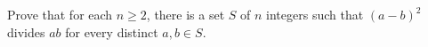 Prove that for each $n\geq 2$,  there is a set $S$ of $n$ integers such that $(a-b)^2$ divides $ab$ for every distinct $a,b\in S$.